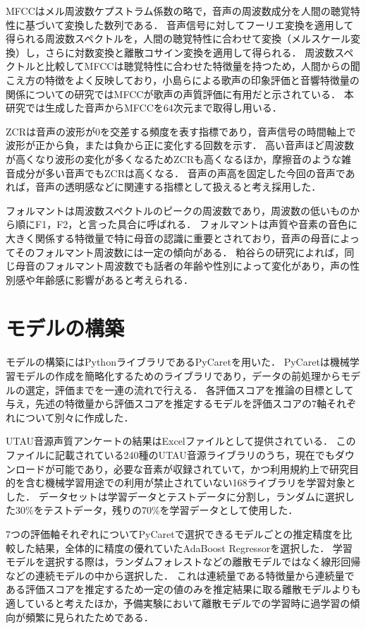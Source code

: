 MFCCはメル周波数ケプストラム係数の略で，音声の周波数成分を人間の聴覚特性に基づいて変換した数列である．
音声信号に対してフーリエ変換を適用して得られる周波数スペクトルを，人間の聴覚特性に合わせて変換（メルスケール変換）し，さらに対数変換と離散コサイン変換を適用して得られる．
周波数スペクトルと比較してMFCCは聴覚特性に合わせた特徴量を持つため，人間からの聞こえ方の特徴をよく反映しており，小島らによる歌声の印象評価と音響特徴量の関係についての研究\cite{mfcc_cute}ではMFCCが歌声の声質評価に有用だと示されている．
本研究では生成した音声からMFCCを64次元まで取得し用いる．

ZCRは音声の波形が0を交差する頻度を表す指標であり，音声信号の時間軸上で波形が正から負，または負から正に変化する回数を示す．
高い音声ほど周波数が高くなり波形の変化が多くなるためZCRも高くなるほか，摩擦音のような雑音成分が多い音声でもZCRは高くなる．
音声の声高を固定した今回の音声であれば，音声の透明感などに関連する指標として扱えると考え採用した．

フォルマントは周波数スペクトルのピークの周波数であり，周波数の低いものから順にF1，F2，と言った具合に呼ばれる．
フォルマントは声質や音素の音色に大きく関係する特徴量で特に母音の認識に重要とされており，音声の母音によってそのフォルマント周波数には一定の傾向がある．
粕谷らの研究によれば，同じ母音のフォルマント周波数でも話者の年齢や性別によって変化があり\cite{formant}，声の性別感や年齢感に影響があると考えられる．

\section{モデルの構築}
\label{sec:model}

モデルの構築にはPythonライブラリであるPyCaretを用いた．
PyCaretは機械学習モデルの作成を簡略化するためのライブラリであり，データの前処理からモデルの選定，評価までを一連の流れで行える．
各評価スコアを推論の目標として与え，先述の特徴量から評価スコアを推定するモデルを評価スコアの7軸それぞれについて別々に作成した．

UTAU音源声質アンケートの結果はExcelファイルとして提供されている．
このファイルに記載されている240種のUTAU音源ライブラリのうち，現在でもダウンロードが可能であり，必要な音素が収録されていて，かつ利用規約上で研究目的を含む機械学習用途での利用が禁止されていない168ライブラリを学習対象とした．
データセットは学習データとテストデータに分割し，ランダムに選択した30\%をテストデータ，残りの70\%を学習データとして使用した．

7つの評価軸それぞれについてPyCaretで選択できるモデルごとの推定精度を比較した結果，全体的に精度の優れていたAdaBoost Regressorを選択した．
学習モデルを選択する際は，ランダムフォレストなどの離散モデルではなく線形回帰などの連続モデルの中から選択した．
これは連続量である特徴量から連続量である評価スコアを推定するため一定の値のみを推定結果に取る離散モデルよりも適していると考えたほか，予備実験において離散モデルでの学習時に過学習の傾向が頻繁に見られたためである．

